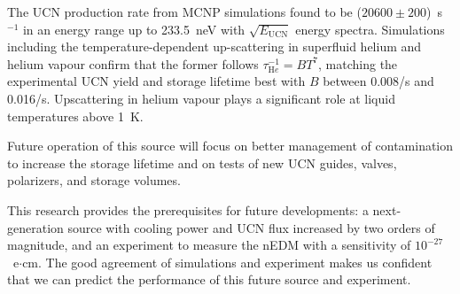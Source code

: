 The UCN production rate from MCNP simulations found to be
($20600\pm 200$)~s$^{-1}$ in an energy range up to 233.5~neV with
$\sqrt{E_\mathrm{UCN}}$ energy spectra. Simulations including the
temperature-dependent up-scattering in superfluid helium and helium
vapour confirm that the former follows
$\tau_{\mathrm He} ^{-1} = B T^7$, matching the experimental UCN yield
and storage lifetime best with $B$ between 0.008/s and
0.016/s. Upscattering in helium vapour plays a significant role at
liquid temperatures above 1~K.

Future operation of this source will focus on better management of
contamination to increase the storage lifetime and on tests of new UCN
guides, valves, polarizers, and storage volumes.

This research provides the prerequisites for future developments: a
next-generation source with cooling power and UCN flux increased by
two orders of magnitude, and an experiment to measure the nEDM with a
sensitivity of $10^{-27}$~e$\cdot$cm. The good agreement of
simulations and experiment makes us confident that we can predict the
performance of this future source and experiment.









  
  
  
